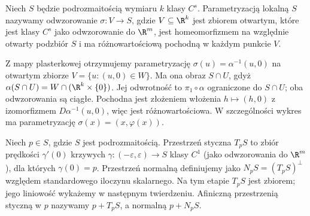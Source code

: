 \begin{definicja}
\label{ma2:def:local-parametrization}
Niech $S$ będzie podrozmaitością wymiaru $k$
klasy $C^s$. Parametryzacją lokalną $S$ nazywamy odwzorowanie
$\sigma:V\to S$, gdzie $V\subseteq\R^k$ jest zbiorem otwartym,
które jest klasy $C^s$ jako odwzorowanie do $\R^m$,
jest homeomorfizmem na względnie otwarty podzbiór $S$
i ma różnowartościową pochodną w każdym punkcie $V$.
\end{definicja}

Z mapy plasterkowej otrzymujemy parametryzację
$\sigma(u)=\alpha^{-1}(u,0)$ na otwartym zbiorze
$V=\{u:(u,0)\in W\}$. Ma ona obraz $S\cap U$,
gdyż $\alpha(S\cap U)=W\cap(\R^k\times\{0\})$.
Jej odwrotność to $\pi_1\circ\alpha$ ograniczone do
$S\cap U$; oba odwzorowania są ciągłe.
Pochodna jest złożeniem włożenia $h\mapsto(h,0)$
z izomorfizmem $D\alpha^{-1}(u,0)$, więc jest
różnowartościowa. W szczególności wykres ma
parametryzację $\sigma(x)=(x,\varphi(x))$.

\begin{definicja}
\label{ma2:def:tangent-submanifold}
Niech $p\in S$, gdzie $S$ jest podrozmaitością.
Przestrzeń styczna $T_pS$ to zbiór prędkości
$\gamma'(0)$ krzywych $\gamma:(-\varepsilon,\varepsilon)\to S$
klasy $C^1$ (jako odwzorowania do $\R^m$), dla których
$\gamma(0)=p$. Przestrzeń normalną definiujemy jako
$N_pS=(T_pS)^\perp$ względem standardowego iloczynu skalarnego.
Na tym etapie $T_pS$ jest zbiorem; jego liniowość
wykażemy w następnym twierdzeniu. Afiniczną przestrzenią
styczną w $p$ nazywamy $p+T_pS$, a normalną $p+N_pS$.
\end{definicja}

